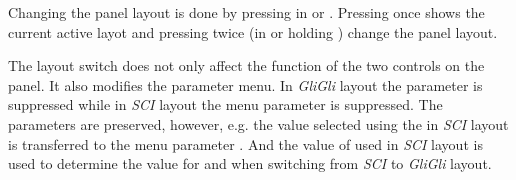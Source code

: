 Changing the panel layout is done by pressing  in \shiftmode or \shiftlock. Pressing  once shows the current active layot and pressing  twice (in \shiftlock or holding \shiftmode) change the panel layout. 


The layout switch does not only affect the function of the two controls on the panel. It also modifies the parameter menu. In \textit{GliGli} layout the parameter \drive is suppressed while in \textit{SCI} layout the menu parameter \glide is suppressed. The parameters are preserved, however, e.g. the value selected using the \glidepot in \textit{SCI} layout is transferred to the menu parameter \glide. And the value of \drive used in \textit{SCI} layout is used to determine the value for \vola and \volb when switching from \textit{SCI} to \textit{GliGli} layout. 
